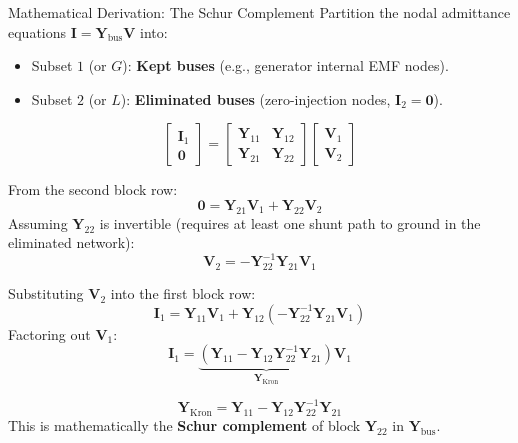 \begin{frame}[allowframebreaks]{Mathematical Derivation: The Schur Complement}
    Partition the nodal admittance equations $\mathbf{I} = \mathbf{Y}_{\text{bus}} \mathbf{V}$ into:
    \begin{itemize}
        \item Subset $1$ (or $G$): \textbf{Kept buses} (e.g., generator internal EMF nodes).
        \item Subset $2$ (or $L$): \textbf{Eliminated buses} (zero-injection nodes, $\mathbf{I}_2 = \mathbf{0}$).
    \end{itemize}

    \begin{equation}
        \begin{bmatrix} \mathbf{I}_1 \\ \mathbf{0} \end{bmatrix}
        =
        \begin{bmatrix}
            \mathbf{Y}_{11} & \mathbf{Y}_{12} \\
            \mathbf{Y}_{21} & \mathbf{Y}_{22}
        \end{bmatrix}
        \begin{bmatrix} \mathbf{V}_1 \\ \mathbf{V}_2 \end{bmatrix}
    \end{equation}

    From the second block row:
    \begin{equation}
        \mathbf{0} = \mathbf{Y}_{21} \mathbf{V}_1 + \mathbf{Y}_{22} \mathbf{V}_2
    \end{equation}
    Assuming $\mathbf{Y}_{22}$ is invertible (requires at least one shunt path to ground in the eliminated network):
    \begin{equation}
        \mathbf{V}_2 = -\mathbf{Y}_{22}^{-1} \mathbf{Y}_{21} \mathbf{V}_1
    \end{equation}

    Substituting $\mathbf{V}_2$ into the first block row:
    \begin{equation}
        \mathbf{I}_1 = \mathbf{Y}_{11} \mathbf{V}_1 + \mathbf{Y}_{12} \left(-\mathbf{Y}_{22}^{-1} \mathbf{Y}_{21} \mathbf{V}_1\right)
    \end{equation}
    Factoring out $\mathbf{V}_1$:
    \begin{equation}
        \mathbf{I}_1 = \underbrace{\left(\mathbf{Y}_{11} - \mathbf{Y}_{12} \mathbf{Y}_{22}^{-1} \mathbf{Y}_{21}\right)}_{\mathbf{Y}_{\text{Kron}}} \mathbf{V}_1
    \end{equation}

    \begin{tcolorbox}[colback=blue!5,colframe=belgianblue,title=Kron Reduced Admittance Matrix]
        \begin{equation}
            \mathbf{Y}_{\text{Kron}} = \mathbf{Y}_{11} - \mathbf{Y}_{12} \mathbf{Y}_{22}^{-1} \mathbf{Y}_{21}
        \end{equation}
        This is mathematically the \textbf{Schur complement} of block $\mathbf{Y}_{22}$ in $\mathbf{Y}_{\text{bus}}$.
    \end{tcolorbox}
\end{frame}

